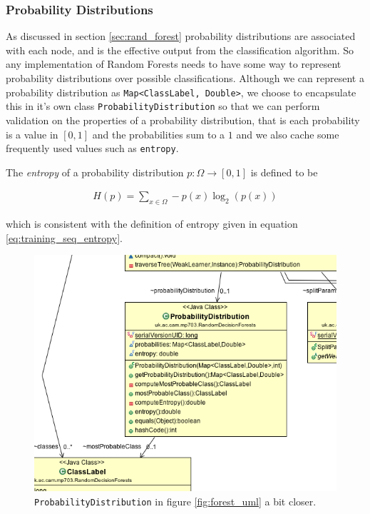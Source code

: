 \documentclass[12pt,twoside,notitlepage]{report}
\begin{document}
            \subsubsection{Probability Distributions} \label{sec:prob_dist}
                As discussed in section \ref{sec:rand_forest} probability distributions are associated with each node, 
                and is the effective output from the classification algorithm. So any implementation of Random Forests 
                needs to have some way to represent probability distributions over possible classifications. Although 
                we can represent a probability distribution as \texttt{Map<ClassLabel, Double>}, we choose to 
                encapsulate this in it's own class \texttt{ProbabilityDistribution} so that we can perform validation
                on the properties of a probability distribution, that is each probability is a value in $[0,1]$ and 
                the probabilities sum to a $1$ and we also cache some frequently used values such as \texttt{entropy}. 

                The \textit{entropy} of a probability distribution $p:\Omega\rightarrow[0,1]$ is defined to be

                \begin{align}
                  H(p) = \sum\limits_{x\in\Omega} -p(x) \log_2(p(x))
                  \label{eq:prob_entropy}
                \end{align}

                which is consistent with the definition of entropy given in equation \ref{eq:training_seq_entropy}.

                \begin{figure}[H]
                    \centering
                    \includegraphics[scale=0.5]{ProbabilityDistribution_Forest_UML}
                    \caption{\texttt{ProbabilityDistribution} in figure \ref{fig:forest_uml} a bit closer.}
                    \label{fig:prob_dist_uml}
                \end{figure}
\end{document}
